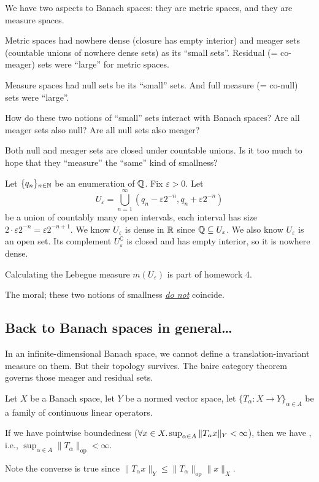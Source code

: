 \begin{node}
We have two aspects to Banach spaces: they are metric spaces, and they
are measure spaces.

Metric spaces had nowhere dense (closure has empty interior) and
meager sets (countable unions of nowhere dense sets) as its ``small sets''.
Residual (= co-meager) sets were ``large'' for metric spaces.

Measure spaces had null sets be its ``small'' sets. And full measure
(= co-null) sets were ``large''.

How do these two notions of ``small'' sets interact with Banach
spaces? Are all meager sets also null? Are all null sets also meager?
\end{node}

\begin{observation}
Both null and meager sets are closed under countable unions. Is it too
much to hope that they ``measure'' the ``same'' kind of smallness?
\end{observation}

\begin{example}
Let $\{q_{n}\}_{n\in\mathbb{N}}$ be an enumeration of $\mathbb{Q}$. Fix
$\varepsilon>0$. Let
\begin{equation}
U_{\varepsilon}=\bigcup_{n=1}^{\infty}(q_{n}-\varepsilon 2^{-n},q_{n}+\varepsilon2^{-n})
\end{equation}
be a union of countably many open intervals, each interval has size
$2\cdot\varepsilon2^{-n}=\varepsilon2^{-n+1}$. We know
$U_{\varepsilon}$ is dense in $\mathbb{R}$ since $\mathbb{Q}\subseteq U_{\varepsilon}$.
We also know $U_{\varepsilon}$ is an open set. Its complement
$U_{\varepsilon}^{\complement}$ is closed and has empty interior, so
it is nowhere dense.

Calculating the Lebegue measure $m(U_{\varepsilon})$ is part of
homework 4.

The moral; these two notions of smallness \underline{\emph{do not}} coincide.
\end{example}

\subsection*{Back to Banach spaces in general\dots}

\begin{fact}
In an infinite-dimensional Banach space, we cannot define a
translation-invariant measure on them. But their topology
survives. The baire category theorem governs those meager and residual sets.
\end{fact}

\begin{theorem}
Let $X$ be a Banach space, let $Y$ be a normed vector space, let
$\{T_{\alpha}\colon X\to Y\}_{\alpha\in A}$ be a family of continuous
linear operators.

If we have pointwise boundedness ($\forall x\in X\ldotp\sup_{\alpha\in A}\|T_{\alpha}x\|_{Y}<\infty$),
then we have , i.e., $\sup_{\alpha\in A}\|T_{\alpha}\|_{\text{op}}<\infty$.
\end{theorem}

Note the converse is true since
$\|T_{\alpha}x\|_{Y}\leq\|T_{\alpha}\|_{\text{op}}\|x\|_{X}$. 